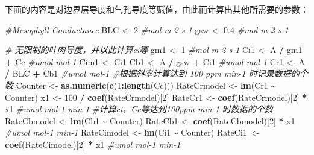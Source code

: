 \documentclass[
]{krantz}
\makeatletter
\newenvironment{Shaded}{\begin{snugshade}}{\end{snugshade}}
\newcommand{\CommentTok}[1]{\textcolor[rgb]{0.56,0.35,0.01}{\textit{#1}}}
\newcommand{\DecValTok}[1]{\textcolor[rgb]{0.00,0.00,0.81}{#1}}
\newcommand{\FloatTok}[1]{\textcolor[rgb]{0.00,0.00,0.81}{#1}}
\newcommand{\KeywordTok}[1]{\textcolor[rgb]{0.13,0.29,0.53}{\textbf{#1}}}
\newcommand{\NormalTok}[1]{#1}
\newcommand{\OperatorTok}[1]{\textcolor[rgb]{0.81,0.36,0.00}{\textbf{#1}}}
\newcommand{\StringTok}[1]{\textcolor[rgb]{0.31,0.60,0.02}{#1}}
\newenvironment{kframe}{%
\medskip{}
\setlength{\fboxsep}{.8em}
 \def\at@end@of@kframe{}%
 \ifinner\ifhmode%
  \def\at@end@of@kframe{\end{minipage}}%
  \begin{minipage}{\columnwidth}%
 \fi\fi%
 \def\FrameCommand##1{\hskip\@totalleftmargin \hskip-\fboxsep
 \colorbox{shadecolor}{##1}\hskip-\fboxsep
     \hskip-\linewidth \hskip-\@totalleftmargin \hskip\columnwidth}%
 \MakeFramed {\advance\hsize-\width
   \@totalleftmargin\z@ \linewidth\hsize
   \@setminipage}}%
 {\par\unskip\endMakeFramed%
 \at@end@of@kframe}
\renewenvironment{Shaded}{\begin{kframe}}{\end{kframe}}
\makeatother
\begin{document}
下面的内容是对边界层导度和气孔导度等赋值，由此而计算出其他所需要的参数：

\begin{Shaded}
\begin{Highlighting}[]
\CommentTok{\#Mesophyll Conductance}
\NormalTok{BLC \textless{}{-}}\StringTok{ }\DecValTok{2} \CommentTok{\#mol m{-}2 s{-}1}
\NormalTok{gsw \textless{}{-}}\StringTok{ }\FloatTok{0.4} \CommentTok{\#mol m{-}2 s{-}1}

\CommentTok{\# 无限制的叶肉导度，并以此计算ci等}
\NormalTok{gm1 \textless{}{-}}\StringTok{ }\DecValTok{1} \CommentTok{\#mol m{-}2 s{-}1}
\NormalTok{Ci1 \textless{}{-}}\StringTok{ }\NormalTok{A }\OperatorTok{/}\StringTok{ }\NormalTok{gm1 }\OperatorTok{+}\StringTok{ }\NormalTok{Cc }\CommentTok{\#umol mol{-}1}
\NormalTok{Cim1 \textless{}{-}}\StringTok{ }\NormalTok{Ci1}
\NormalTok{Cb1 \textless{}{-}}\StringTok{ }\NormalTok{A }\OperatorTok{/}\StringTok{ }\NormalTok{gsw }\OperatorTok{+}\StringTok{ }\NormalTok{Ci1 }\CommentTok{\#umol mol{-}1}
\NormalTok{Cr1 \textless{}{-}}\StringTok{ }\NormalTok{A }\OperatorTok{/}\StringTok{ }\NormalTok{BLC }\OperatorTok{+}\StringTok{ }\NormalTok{Cb1 }\CommentTok{\#umol mol{-}1}
\CommentTok{\#根据斜率计算达到 100 ppm min{-}1 时记录数据的个数}
\NormalTok{Counter \textless{}{-}}\StringTok{ }\KeywordTok{as.numeric}\NormalTok{(}\KeywordTok{c}\NormalTok{(}\DecValTok{1}\OperatorTok{:}\KeywordTok{length}\NormalTok{(Cc)))}
\NormalTok{RateCrmodel \textless{}{-}}\StringTok{ }\KeywordTok{lm}\NormalTok{(Cr1 }\OperatorTok{\textasciitilde{}}\StringTok{ }\NormalTok{Counter)}
\NormalTok{x1 \textless{}{-}}\StringTok{ }\DecValTok{100} \OperatorTok{/}\StringTok{ }\KeywordTok{coef}\NormalTok{(RateCrmodel)[}\DecValTok{2}\NormalTok{] }
\NormalTok{RateCr1 \textless{}{-}}\StringTok{ }\KeywordTok{coef}\NormalTok{(RateCrmodel)[}\DecValTok{2}\NormalTok{] }\OperatorTok{*}\StringTok{ }\NormalTok{x1 }\CommentTok{\#umol mol{-}1 min{-}1}
\CommentTok{\#计算ci，Cc等达到100ppm min{-}1 时数据的个数}
\NormalTok{RateCbmodel \textless{}{-}}\StringTok{ }\KeywordTok{lm}\NormalTok{(Cb1 }\OperatorTok{\textasciitilde{}}\StringTok{ }\NormalTok{Counter)}
\NormalTok{RateCb1 \textless{}{-}}\StringTok{ }\KeywordTok{coef}\NormalTok{(RateCbmodel)[}\DecValTok{2}\NormalTok{] }\OperatorTok{*}\StringTok{ }\NormalTok{x1 }\CommentTok{\#umol mol{-}1 min{-}1}
\NormalTok{RateCimodel \textless{}{-}}\StringTok{ }\KeywordTok{lm}\NormalTok{(Ci1 }\OperatorTok{\textasciitilde{}}\StringTok{ }\NormalTok{Counter)}
\NormalTok{RateCi1 \textless{}{-}}\StringTok{ }\KeywordTok{coef}\NormalTok{(RateCimodel)[}\DecValTok{2}\NormalTok{] }\OperatorTok{*}\StringTok{ }\NormalTok{x1 }\CommentTok{\#umol mol{-}1 min{-}1}

\end{Highlighting}
\end{Shaded}
\end{document}
